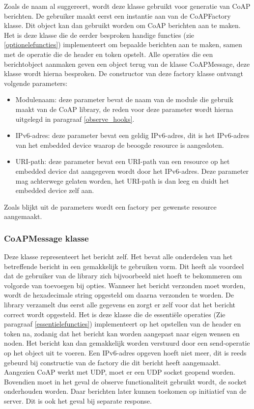 Zoals de naam al suggereert, wordt deze klasse gebruikt voor generatie van CoAP berichten. De gebruiker maakt eerst een instantie aan van de CoAPFactory klasse. Dit object kan dan gebruikt worden om CoAP berichten aan te maken. Het is deze klasse die de eerder besproken handige functies (zie \ref{optionelefuncties}) implementeert om bepaalde berichten aan te maken, samen met de operatie die de header en token opstelt. Alle operaties die een berichtobject aanmaken geven een object terug van de klasse CoAPMessage, deze klasse wordt hierna besproken. De constructor van deze factory klasse ontvangt volgende parameters:
\begin{itemize}
\item Modulenaam: deze parameter bevat de naam van de module die gebruik maakt van de CoAP library, de reden voor deze parameter wordt hierna uitgelegd in paragraaf \ref{observe_hooks}.
\item IPv6-adres: deze parameter bevat een geldig IPv6-adres, dit is het IPv6-adres van het embedded device waarop de beoogde resource is aangesloten.
\item URI-path: deze parameter bevat een URI-path van een resource op het embedded device dat aangegeven wordt door het IPv6-adres. Deze parameter mag achterwege gelaten worden, het URI-path is dan leeg en duidt het embedded device zelf aan.
\end{itemize}
Zoals blijkt uit de parameters wordt een factory per gewenste resource aangemaakt.

\subsubsection{CoAPMessage klasse}

Deze klasse representeert het bericht zelf. Het bevat alle onderdelen van het betreffende bericht in een gemakkelijk te gebruiken vorm. Dit heeft als voordeel dat de gebruiker van de library zich bijvoorbeeld niet hoeft te bekommeren om volgorde van toevoegen bij opties. Wanneer het bericht verzonden moet worden, wordt de hexadecimale string opgesteld om daarna verzonden te worden. De library verzamelt dus eerst alle gegevens en zorgt er zelf voor dat het bericht correct wordt opgesteld. Het is deze klasse die de essenti\"{e}le operaties (Zie paragraaf \ref{essentielefuncties}) implementeert op het opstellen van de header en token na, zodanig dat het bericht kan worden aangepast naar eigen wensen en noden. Het bericht kan dan gemakkelijk worden verstuurd door een send-operatie op het object uit te voeren. Een IPv6-adres opgeven hoeft niet meer, dit is reeds gebeurd bij constructie van de factory die dit bericht heeft aangemaakt. Aangezien CoAP werkt met UDP, moet er een UDP socket geopend worden. Bovendien moet in het geval de observe functionaliteit gebruikt wordt, de socket onderhouden worden. Daar berichten later kunnen toekomen op initiatief van de server. Dit is ook het geval bij separate response.

